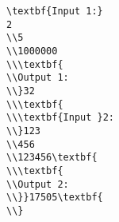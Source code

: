 \begin{verbatim}
\textbf{Input 1:}
2
\\5
\\1000000
\\\textbf{
\\Output 1:
\\}32
\\\textbf{
\\\textbf{Input }2:
\\}123
\\456
\\123456\textbf{
\\\textbf{
\\Output 2:
\\}}17505\textbf{
\\}\end{verbatim}